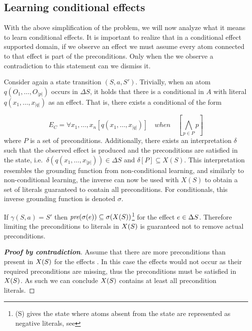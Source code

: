 \documentclass[\master/Master.tex]{subfiles}
\begin{document}
\subsection{Learning conditional effects}


With the above simplification of the problem, we will now analyze what it means to learn conditional effects.
It is important to realize that in a conditional effect supported domain, if we observe an effect we must assume every atom connected to that effect is part of the preconditions. Only when the we observe a contradiction to this statement can we dismiss it. 

Consider again a state transition $(S,a,S')$. Trivially, when an atom $q\left(O_1, \dots, O_{|p|}\right)$ occurs in $\Delta S$, it holds that there is a conditional in $A$ with literal $q\left(x_1, \dots, x_{|q|}\right)$ as an effect. That is, there exists a conditional of the form

\begin{equation*}
    E_C = \forall x_1, \dots, x_n 
    \left[ q\left(x_1, \dots, x_{|q|} \right) \right] \quad when \quad 
    \left[ \bigwedge_{p \in P} p \right]
\end{equation*}
where $P$ is a set of preconditions. Additionally, there exists an interpretation $\delta$ such that the observed effect is produced and the preconditions are satisfied in the state, i.e.\ $\delta\left(q\left(x_1, \dots, x_{|p|} \right)\right) \in \Delta S$ and $\delta\left[ P \right] \subseteq X(S)$. This interpretation resembles the grounding function from non-conditional learning, and similarly to non-conditional learning, the inverse can now be used with $X(S)$ to obtain a set of literals guaranteed to contain all preconditions. For conditionals, this inverse grounding function is denoted $\sigma$.


\begin{theorem}\label{thm:ca:precondition-state}
If $\gamma (S,a) = S'$ then $\textit{pre}(\sigma(e)) \subseteq \sigma(X(S))$\footnote{\ts(S) gives the state where atoms absent from the state are represented as negative literals, see } for the effect $e \in \Delta S$.
Therefore limiting the preconditions to literals in $X(S)$ is guaranteed not to remove actual preconditions.
\end{theorem}
\begin{proof}[\textbf{Proof by contradiction}] Assume that there are more preconditions than present in $X(S)$ for the effects \geffects.
	In this case the effects would not occur as their required preconditions are missing, thus the preconditions must be satisfied in $X(S)$.
	As such we can conclude $X(S)$ contains at least all precondition literals.
\end{proof}
\end{document}

